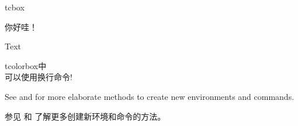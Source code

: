 \begin{docCommand}{tcbox}{}
\begin{带标题示例}{你好哇！}
\begin{调用系统命令的例子}{}
\usepackage[all]{tcolorbox}

\thispagestyle{empty}
Text  \hfill

\end{调用系统命令的例子}
\end{带标题示例}


\begin{dispExample}

\begin{tcolorbox}tcolorbox中\\可以使用换行命令!\end{tcolorbox}


\end{dispExample}

\end{docCommand}


\begin{marker}
See  and  for more
elaborate methods to create new environments and commands.

参见  和  了解更多创建新环境和命令的方法。%
\end{marker}